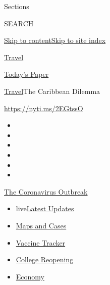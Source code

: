 Sections

SEARCH

\protect\hyperlink{site-content}{Skip to
content}\protect\hyperlink{site-index}{Skip to site index}

\href{https://www.nytimes3xbfgragh.onion/section/travel}{Travel}

\href{https://myaccount.nytimes3xbfgragh.onion/auth/login?response_type=cookie\&client_id=vi}{}

\href{https://www.nytimes3xbfgragh.onion/section/todayspaper}{Today's
Paper}

\href{/section/travel}{Travel}\textbar{}The Caribbean Dilemma

\url{https://nyti.ms/2EGtssO}

\begin{itemize}
\item
\item
\item
\item
\item
\item
\end{itemize}

\href{https://www.nytimes3xbfgragh.onion/news-event/coronavirus?action=click\&pgtype=Article\&state=default\&region=TOP_BANNER\&context=storylines_menu}{The
Coronavirus Outbreak}

\begin{itemize}
\tightlist
\item
  live\href{https://www.nytimes3xbfgragh.onion/2020/08/04/world/coronavirus-cases.html?action=click\&pgtype=Article\&state=default\&region=TOP_BANNER\&context=storylines_menu}{Latest
  Updates}
\item
  \href{https://www.nytimes3xbfgragh.onion/interactive/2020/us/coronavirus-us-cases.html?action=click\&pgtype=Article\&state=default\&region=TOP_BANNER\&context=storylines_menu}{Maps
  and Cases}
\item
  \href{https://www.nytimes3xbfgragh.onion/interactive/2020/science/coronavirus-vaccine-tracker.html?action=click\&pgtype=Article\&state=default\&region=TOP_BANNER\&context=storylines_menu}{Vaccine
  Tracker}
\item
  \href{https://www.nytimes3xbfgragh.onion/2020/08/02/us/covid-college-reopening.html?action=click\&pgtype=Article\&state=default\&region=TOP_BANNER\&context=storylines_menu}{College
  Reopening}
\item
  \href{https://www.nytimes3xbfgragh.onion/live/2020/08/04/business/stock-market-today-coronavirus?action=click\&pgtype=Article\&state=default\&region=TOP_BANNER\&context=storylines_menu}{Economy}
\end{itemize}

